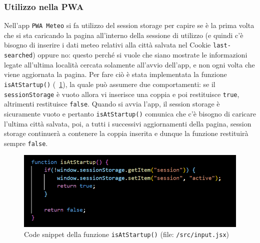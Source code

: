 \documentclass[a4paper, 12pt, twoside, openright]{book}
\begin{document}
\subsubsection{Utilizzo nella PWA}
Nell'app \texttt{PWA Meteo} si fa utilizzo del session storage per capire se è la prima volta che si sta caricando la pagina all'interno della sessione di utilizzo (e quindi c'è bisogno di inserire i dati meteo relativi alla città salvata nel Cookie \texttt{last-searched}) oppure no: questo perché si vuole che siano mostrate le informazioni legate all'ultima località cercata solamente all'avvio dell'app, e non ogni volta che viene aggiornata la pagina. Per fare ciò è stata implementata la funzione \texttt{isAtStartup()} (\figurename~\ref{storages:isAtStartup}), la quale può assumere due comportamenti: se il \texttt{sessionStorage} è vuoto allora vi inserisce una coppia e poi restituisce \texttt{true}, altrimenti restituisce \texttt{false}. Quando si avvia l'app, il session storage è sicuramente vuoto e pertanto \texttt{isAtStartup()} comunica che c'è bisogno di caricare l'ultima città salvata, poi, a tutti i successivi aggiornamenti della pagina, session storage continuerà a contenere la coppia inserita e dunque la funzione restituirà sempre \texttt{false}.
\begin{figure}[ht]
  \centering
  \includegraphics[width=14cm]{images/local&session_storage/isAtStartup.png}
  \caption{Code snippet della funzione \texttt{isAtStartup()} (file: \texttt{/src/input.jsx})}
  \label{storages:isAtStartup}
\end{figure}
\end{document}
